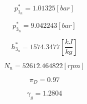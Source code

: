 \documentclass[12pt,english]{article}
\begin{document}
\begin{equation}
  p_{1_{n}}^{*} =  1.01325 [bar]
\end{equation}

\begin{equation}
  p_{3_{n}}^{*} =  9.042243 [bar]
\end{equation}

\begin{equation}
  h_{3_{n}}^{*} =  1574.3477 \left[\frac{kJ}{kg}\right]
\end{equation}

\begin{equation}
  N_{n} = 52612.464822 [rpm]
\end{equation}

\begin{equation}
  \pi_{D} = 0.97
\end{equation}

\begin{equation}
  \gamma_{g} = 1.2804
\end{equation}
\end{document}
